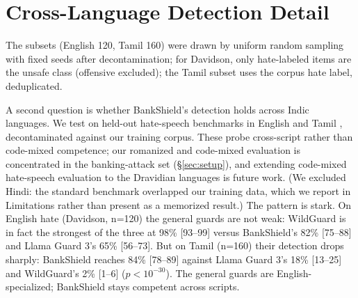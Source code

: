 \documentclass[11pt]{article}
\begin{document}
\begin{table}[t]
\centering
\small
\setlength{\tabcolsep}{4pt}
\caption{Where prior guards sit on the dimensions this paper addresses: Indic coverage, banking focus, a fairness audit \emph{of the guard itself}, and evaluation in deployment (for BankShield, a self-hosted volunteer test pilot; \S\ref{sec:intro}). CultureGuard (NVIDIA, Llama-based) and L3Cube-IndicGuard (Gemma-based) are distinct systems; we evaluate the latter. (``Fair.'' = fairness audit.)}
\label{app:positioning}\label{tab:positioning}
\end{table}

\section{Cross-Language Detection Detail}
\label{app:crosslang}
The subsets (English 120, Tamil 160) were drawn by uniform random sampling with fixed seeds after decontamination; for Davidson, only hate-labeled items are the unsafe class (offensive excluded); the Tamil subset uses the corpus hate label, deduplicated.
\label{sec:crosslang}

A second question is whether BankShield's detection holds across Indic languages. We test on held-out hate-speech benchmarks in English \citep{davidson2017} and Tamil \citep{tamilhate2024}, decontaminated against our training corpus. These probe cross-script rather than code-mixed competence; our romanized and code-mixed evaluation is concentrated in the banking-attack set (\S\ref{sec:setup}), and extending code-mixed hate-speech evaluation to the Dravidian languages is future work. (We excluded Hindi: the standard benchmark overlapped our training data, which we report in Limitations rather than present as a memorized result.) The pattern is stark. On English hate (Davidson, n=120) the general guards are not weak: WildGuard is in fact the strongest of the three at 98\% [93--99] versus BankShield's 82\% [75--88] and Llama Guard 3's 65\% [56--73]. But on Tamil (n=160) their detection drops sharply: BankShield reaches 84\% [78--89] against Llama Guard 3's 18\% [13--25] and WildGuard's 2\% [1--6] ($p{<}10^{-30}$). The general guards are English-specialized; BankShield stays competent across scripts.
\end{document}
